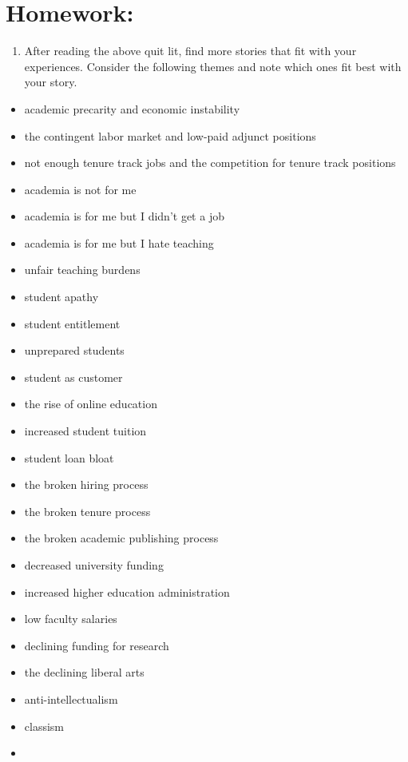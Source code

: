 \documentclass[]{book}
\providecommand{\tightlist}{%
  \setlength{\itemsep}{0pt}\setlength{\parskip}{0pt}}
\theoremstyle{definition}
\theoremstyle{definition}
\theoremstyle{definition}
\theoremstyle{remark}
\begin{document}
\section{Homework:}\label{homework}

\begin{enumerate}
\def\labelenumi{\arabic{enumi}.}
\tightlist
\item
  After reading the above quit lit, find more stories that fit with your
  experiences. Consider the following themes and note which ones fit
  best with your story.
\end{enumerate}

\begin{itemize}
\tightlist
\item
  academic precarity and economic instability
\item
  the contingent labor market and low-paid adjunct positions
\item
  not enough tenure track jobs and the competition for tenure track
  positions
\item
  academia is not for me
\item
  academia is for me but I didn't get a job
\item
  academia is for me but I hate teaching
\item
  unfair teaching burdens
\item
  student apathy
\item
  student entitlement
\item
  unprepared students
\item
  student as customer
\item
  the rise of online education
\item
  increased student tuition
\item
  student loan bloat
\item
  the broken hiring process
\item
  the broken tenure process
\item
  the broken academic publishing process
\item
  decreased university funding
\item
  increased higher education administration
\item
  low faculty salaries
\item
  declining funding for research
\item
  the declining liberal arts
\item
  anti-intellectualism
\item
  classism
\item

\end{itemize}
\end{document}
